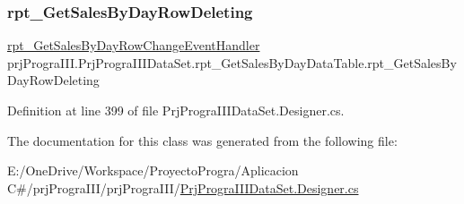 \hypertarget{classprj_progra_i_i_i_1_1_prj_progra_i_i_i_data_set_1_1rpt___get_sales_by_day_data_table_adebe3f4a124071223ec3938a142969bd}{}\label{classprj_progra_i_i_i_1_1_prj_progra_i_i_i_data_set_1_1rpt___get_sales_by_day_data_table_adebe3f4a124071223ec3938a142969bd} 
\subsubsection{\texorpdfstring{rpt\+\_\+\+Get\+Sales\+By\+Day\+Row\+Deleting}{rpt\_GetSalesByDayRowDeleting}}
{\footnotesize\ttfamily \hyperlink{classprj_progra_i_i_i_1_1_prj_progra_i_i_i_data_set_aa1d46bd3c23f7f4fb63afc2bdb363a5b}{rpt\+\_\+\+Get\+Sales\+By\+Day\+Row\+Change\+Event\+Handler} prj\+Progra\+I\+I\+I.\+Prj\+Progra\+I\+I\+I\+Data\+Set.\+rpt\+\_\+\+Get\+Sales\+By\+Day\+Data\+Table.\+rpt\+\_\+\+Get\+Sales\+By\+Day\+Row\+Deleting}



Definition at line 399 of file Prj\+Progra\+I\+I\+I\+Data\+Set.\+Designer.\+cs.



The documentation for this class was generated from the following file\+:\begin{DoxyCompactItemize}
\item 
E\+:/\+One\+Drive/\+Workspace/\+Proyecto\+Progra/\+Aplicacion C\#/prj\+Progra\+I\+I\+I/prj\+Progra\+I\+I\+I/\hyperlink{_prj_progra_i_i_i_data_set_8_designer_8cs}{Prj\+Progra\+I\+I\+I\+Data\+Set.\+Designer.\+cs}\end{DoxyCompactItemize}
